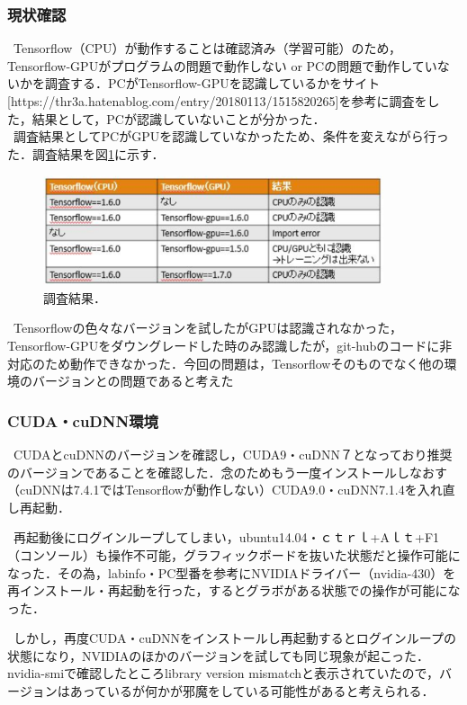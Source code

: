 \documentclass[11pt,a4j,ascmac]{jarticle}
\begin{document}
\subsubsection{現状確認}
\  Tensorflow（CPU）が動作することは確認済み（学習可能）のため，Tensorflow-GPUがプログラムの問題で動作しない or PCの問題で動作していないかを調査する．PCがTensorflow-GPUを認識しているかをサイト[https://thr3a.hatenablog.com/entry/20180113/1515820265]を参考に調査をした，結果として，PCが認識していないことが分かった．\\

\  調査結果としてPCがGPUを認識していなかったため、条件を変えながら行った．調査結果を図\ref{fig:survey}に示す．

      \begin{figure}[htpp]
      \centering
      \includegraphics[width=100mm]{調査結果.eps}
      \vspace*{20mm}
      \caption{調査結果．}
      \label{fig:survey}
      \end{figure}


\  Tensorflowの色々なバージョンを試したがGPUは認識されなかった，Tensorflow-GPUをダウングレードした時のみ認識したが，git-hubのコードに非対応のため動作できなかった．今回の問題は，Tensorflowそのものでなく他の環境のバージョンとの問題であると考えた



\subsubsection{CUDA・cuDNN環境}

\  CUDAとcuDNNのバージョンを確認し，CUDA9・cuDNN７となっており推奨のバージョンであることを確認した．念のためもう一度インストールしなおす（cuDNNは7.4.1ではTensorflowが動作しない）CUDA9.0・cuDNN7.1.4を入れ直し再起動．

\  再起動後にログインループしてしまい，ubuntu14.04・ｃｔｒｌ+Aｌｔ+F1（コンソール）も操作不可能，グラフィックボードを抜いた状態だと操作可能になった．その為，labinfo・PC型番を参考にNVIDIAドライバー（nvidia-430）を再インストール・再起動を行った，するとグラボがある状態での操作が可能になった．

\  しかし，再度CUDA・cuDNNをインストールし再起動するとログインループの状態になり，NVIDIAのほかのバージョンを試しても同じ現象が起こった．nvidia-smiで確認したところlibrary version mismatchと表示されていたので，バージョンはあっているが何かが邪魔をしている可能性があると考えられる．
\end{document}
